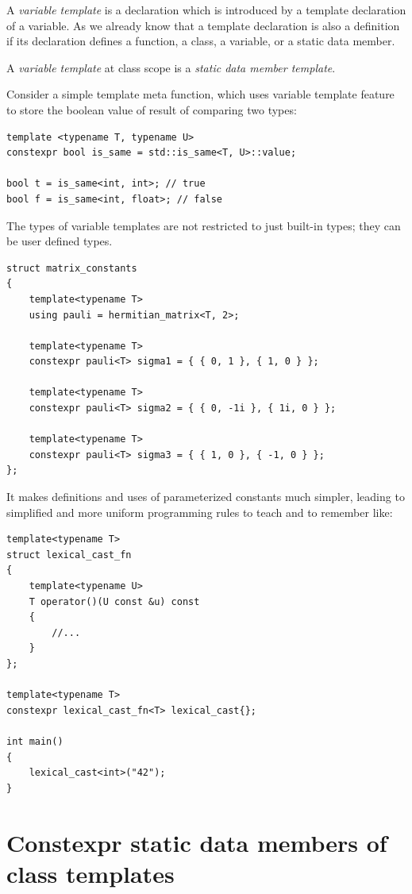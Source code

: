 \begin{Answer}[ref=ex01]
A \emph{variable template} is a declaration which is introduced by a template declaration of a variable. As we already know that a template declaration is also a definition if its declaration defines a function, a class, a variable, or a static data member.

A \emph{variable template} at class scope is a \emph{static data member template}.

Consider a simple template meta function, which uses variable template feature to store the boolean value of result of comparing two types:
\begin{lstlisting}
template <typename T, typename U>
constexpr bool is_same = std::is_same<T, U>::value;

bool t = is_same<int, int>; // true
bool f = is_same<int, float>; // false
\end{lstlisting}

The types of variable templates are not restricted to just built-in types; they can be user defined types.
\begin{lstlisting}
struct matrix_constants 
{
    template<typename T>
    using pauli = hermitian_matrix<T, 2>;
    
    template<typename T>
    constexpr pauli<T> sigma1 = { { 0, 1 }, { 1, 0 } };

    template<typename T>
    constexpr pauli<T> sigma2 = { { 0, -1i }, { 1i, 0 } };

    template<typename T>
    constexpr pauli<T> sigma3 = { { 1, 0 }, { -1, 0 } };
};
\end{lstlisting}

It makes definitions and uses of parameterized constants much simpler, leading to
simplified and more uniform programming rules to teach and to remember like:
\begin{lstlisting}
template<typename T>
struct lexical_cast_fn
{
    template<typename U>
    T operator()(U const &u) const
    {
        //...
    }
};

template<typename T>
constexpr lexical_cast_fn<T> lexical_cast{};

int main()
{
    lexical_cast<int>("42");
}
\end{lstlisting}

\end{Answer}



\section{Constexpr static data members of class templates}

